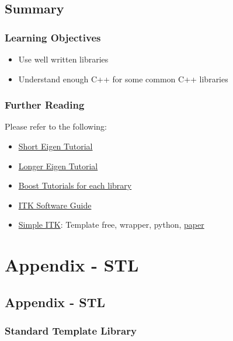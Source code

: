 \subsection{Summary}\label{summary-4}

\subsubsection{Learning Objectives}\label{learning-objectives}

\begin{itemize}
\itemsep1pt\parskip0pt
\item
  Use well written libraries
\item
  Understand enough C++ for some common C++ libraries
\end{itemize}

\subsubsection{Further Reading}\label{further-reading-2}

Please refer to the following:

\begin{itemize}
\itemsep1pt\parskip0pt
\item
  \href{http://eigen.tuxfamily.org/dox/GettingStarted.html}{Short Eigen
  Tutorial}
\item
  \href{http://eigen.tuxfamily.org/dox/group__TutorialMatrixClass.html}{Longer
  Eigen Tutorial}
\item
  \href{http://www.boost.org}{Boost Tutorials for each library}
\item
  \href{http://www.itk.org/ItkSoftwareGuide.pdf}{ITK Software Guide}
\item
  \href{http://www.simpleitk.org}{Simple ITK}: Template free, wrapper,
  python,
  \href{http://www.ncbi.nlm.nih.gov/pmc/articles/PMC3874546/pdf/fninf-07-00045.pdf}{paper}
\end{itemize}

\section{Appendix - STL}\label{appendix---stl}

\subsection{Appendix - STL}\label{appendix---stl-1}

\subsubsection{Standard Template
Library}\label{standard-template-library}

